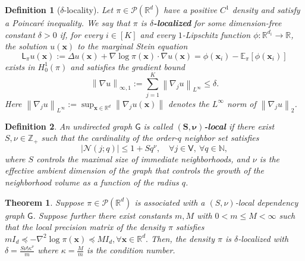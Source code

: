 \documentclass[10pt,a4paper]{amsart}
\newtheorem{defn}{Definition}
\newtheorem{thm}{Theorem}
\newcommand{\E}{\mathbb{E}}
\newcommand{\bx}{{\boldsymbol{x}}}
\newcommand{\gto}{\rightarrow}
\newcommand{\mN}{\mathbb{N}}
\newcommand{\mR}{\mathbb{R}}
\newcommand{\mZ}{\mathbb{Z}}
\newcommand{\mcN}{\mathcal{N}}
\newcommand{\mcP}{\mathcal{P}}
\newcommand{\norm}[1]{\left\|#1\right\|}
\newcommand{\sfG}{\mathsf{G}}
\newcommand{\sfL}{\mathsf{L}}
\newcommand{\sfV}{\mathsf{V}}
\begin{document}
\begin{defn}[$\delta$-locality]
\label{def:PoisGrad}
Let $\pi \in \mcP(\mR^d)$ have a positive $C^1$ density and satisfy a Poincar\'e inequality.
We say that $\pi$ is {\bf $\delta$-localized} for some dimension-free constant $\delta>0$ if, for every $i\in[K]$ and every $1$-Lipschitz function $\phi : \mR^{d_i} \gto \mR$, the solution $u(\bx)$ to the \emph{marginal Stein equation}
\begin{equation}
\label{eqn:PoisEqn}
    \sfL_\pi u (\bx) := \Delta u(\bx) + \nabla \log \pi(\bx) \cdot \nabla u(\bx) = \phi(\bx_i) - \E_\pi [\phi(\bx_i)]
\end{equation}
exists in $H_0^1(\pi)$ and satisfies the gradient bound
\begin{equation}
\label{eqn:PoisGradBound}
    \norm{ \nabla u }_{\infty,1} := \sum_{j=1}^K \norm{ \nabla_j u }_{L^\infty} \le \delta.
\end{equation}
Here $\norm{ \nabla_j u }_{L^\infty} := \sup_{\bx\in\mR^d} \norm{ \nabla_j u(\bx) }$ denotes the $L^\infty$ norm of $\norm{\nabla_j u}_2$.
\end{defn}

\begin{defn}
\label{def:loc_graph}
An undirected graph $\sfG$ is called $\boldsymbol{(S,\nu)}$\textbf{-local} if there exist $S,\nu \in \mZ_+$ such that the cardinality of the order-$q$ neighbor set satisfies
\begin{equation}
\label{eqn:loc_graph}
    |\mcN(j;q)| \le 1 + S q^\nu , \quad \forall j \in \sfV, ~ \forall q\in\mN,
\end{equation}
where $S$ controls the maximal size of immediate neighborhoods, and $\nu$ is the effective ambient dimension of the graph that controls the growth of the neighborhood volume as a function of the radius $q$.
\end{defn}

\begin{thm}
\label{thm:MRF_loc}
Suppose $\pi \in \mcP(\mR^d)$ is associated with a $(S,\nu)$-local dependency graph $\sfG$. Suppose further there exist constants $m,M$ with $0<m\le M<\infty$ such that the local precision matrix of the density $\pi$ satisfies
\(
    m I_d \preceq - \nabla^2 \log \pi(\bx) \preceq M I_d, \forall \bx \in \mR^d.
\)
Then, the density $\pi$ is $\delta$-localized with $\delta = \frac{S \nu! \kappa^\nu }{m}$ where $\kappa = \frac{M}{m}$ is the condition number. 
\end{thm}
\end{document}
